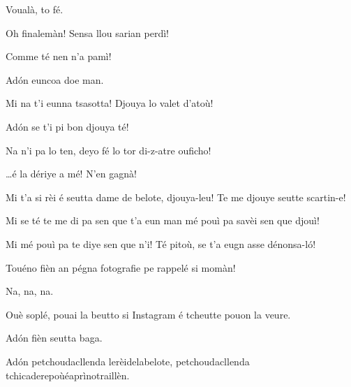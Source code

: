\begin{drama}
\Elettricistaspeaks Voualà, to fé.

\Richardspeaks{} Oh finalemàn! Sensa llou sarian perdì!

\Tuenospeaks{} Comme té nen n'a pamì!


\Tuenospeaks Ad\'on euncoa doe man.


\Elettricistaspeaks {} Mi na t'i eunna tsasotta! Djouya lo valet d'atoù!

\Gerominespeaks Ad\'on se t'i pi bon djouya té!

\Elettricistaspeaks Na n'i pa lo ten, deyo fé lo tor di-z-atre ouficho!


\Saventaspeaks \ldots é la dériye a mé! N'en gagnà! 

\Richardspeaks{} Mi t'a si rèi é seutta dame de belote, djouya-leu! Te me djouye seutte scartin-e!

\Gerominespeaks Mi se té te me di pa sen que t'a eun man mé pouì pa savèi sen que djouì!

\Richardspeaks Mi mé pouì pa te diye sen que n'i! Té pitoù, se t'a eugn asse \asso dénonsa-l\'o!


\Saventaspeaks Touéno fièn an pégna fotografie pe rappelé si mo\-màn!

\Tuenospeaks Na, na, na.

\Saventaspeaks  Ouè soplé, pouai la beutto si Instagram é tcheutte pouon la veure.

\Tuenospeaks Ad\'on fièn seutta baga.


\Saventaspeaks Ad\'on petchoudacllenda lerèidelabelote, petchoudacllen\-da tchicaderepoùéaprìnotraillèn.




\end{drama}
